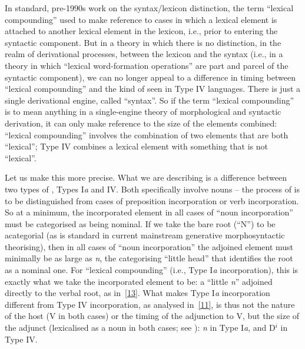 \documentclass[output=paper]{langsci/langscibook}
\begin{document}
\begin{refcontext}
In standard, pre-1990s work on the syntax/lexicon distinction, the term
\enquote{lexical compounding} used to make reference to cases in which a
lexical element is attached to another lexical element in the lexicon, i.e.,
prior to entering the syntactic component. But in a theory in which there is no
distinction, in the realm of derivational processes, between the lexicon and
the syntax (i.e., in a theory in which \enquote{lexical word-formation
operations} are part and parcel of the syntactic component), we can no longer
appeal to a difference in timing between \enquote{lexical compounding} and the
kind of  seen in Type IV languages. There is just a single
derivational engine, called \enquote{syntax}. So if the term \enquote{lexical
compounding} is to mean anything in a single-engine theory of morphological and
syntactic derivation, it can only make reference to the size of the elements
combined: \enquote{lexical compounding} involves the combination of two
elements that are both \enquote{lexical}; Type IV  combines a
lexical element with something that is not \enquote{lexical}.

Let us make this more precise. What we are describing is a difference between
two types of , Types I\emph{a} and IV. Both specifically
involve nouns -- the process of  is to be distinguished from
cases of preposition incorporation or verb incorporation. So at a minimum, the
incorporated element in all cases of \enquote{noun incorporation} must be
categorised as being nominal. If we take the bare root (\enquote{N}) to be
acategorial (as is standard in current mainstream generative morphosyntactic
theorising), then in all cases of \enquote{noun incorporation} the adjoined
element must minimally be as large as \emph{n}, the categorising
\enquote{little head} that identifies the root as a nominal one. For
\enquote{lexical compounding} (i.e., Type I\emph{a} incorporation), this is
exactly what we take the incorporated element to be: a \enquote{little
\emph{n}} adjoined directly to the verbal root, as in~\eqref{13}. What makes Type
I\emph{a} incorporation different from Type IV incorporation, as analysed
in~\eqref{11}, is thus not the nature of the host (V in both cases) or the timing
of the adjunction to V, but the size of the adjunct (lexicalised as a noun in
both cases; see ): \emph{n} in Type I\emph{a}, and D$^i$
in Type IV.


\end{refcontext}
\end{document}
